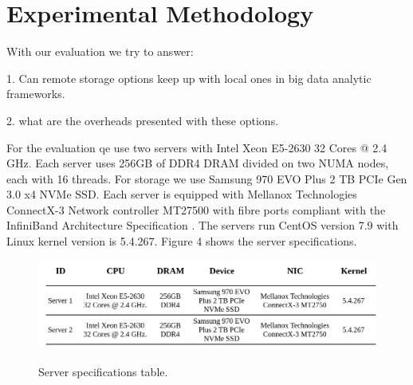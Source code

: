 \vspace{9em}
\section{Experimental Methodology}
With our evaluation we try to answer: 

1. Can remote storage options keep up with local ones in big data analytic
frameworks.

2. what are the overheads presented with these options.

\vspace{1em}

For the evaluation qe use two servers with Intel Xeon E5-2630 32 Cores @ 2.4
GHz. Each server uses 256GB of DDR4 DRAM divided on two NUMA nodes, each with 16
threads. For storage we use Samsung 970 EVO Plus 2 TB PCIe Gen 3.0 x4 NVMe SSD.
Each server is equipped with Mellanox Technologies ConnectX-3 Network controller
MT27500 with fibre ports compliant with the InfiniBand Architecture
Specification . The servers run CentOS version 7.9 with Linux kernel version is
5.4.267.  Figure 4 shows the server specifications.

\begin{figure}[h]
\includegraphics[scale=0.2]{figures/server_specs.drawio.png}\\
\caption{Server specifications table.}
\end{figure}
\vspace{1em}

